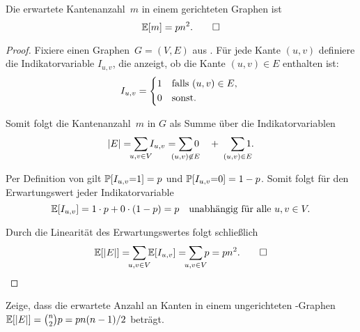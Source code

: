 \begin{lemma}\label{lemma:erwartete_kanten_in_gnp}
    Die  erwartete Kantenanzahl~$m$ in einem gerichteten \Gnp Graphen ist \begin{equation*} \mathbb{E}\!\left[m\right] = p n^2. \qedhere \end{equation*}
\end{lemma}

\begin{proof}
    Fixiere einen Graphen~$G=(V,E)$ aus \Gnp.
    Für jede Kante $(u,v)$ definiere die Indikatorvariable $I_{u,v}$, die anzeigt, ob die Kante $(u,v) \in E$ enthalten ist:
    \begin{equation}
        I_{u,v} = \begin{cases*}
            1 & falls $(u,v) \in E$, \\
            0 & sonst.
        \end{cases*}
    \end{equation}

    \noindent Somit folgt die Kantenanzahl~$m$ in $G$ als Summe über die Indikatorvariablen
    \begin{equation}
        |E| = \smashoperator{\sum_{u,v \in V}} I_{u,v} = \smashoperator{\sum_{(u,v) \not\in E}} 0 \quad + \quad \smashoperator{\sum_{(u,v) \in E}} 1.
    \end{equation}

    \noindent Per Definition von \Gnp gilt $\mathbb{P}\!\left[I_{u,v} {=} 1\right] = p$ und $\mathbb{P}\!\left[I_{u,v} {=} 0\right] = 1-p$.
    Somit folgt für den Erwartungswert jeder Indikatorvariable
    \begin{equation}
        \mathbb{E}\!\left[I_{u,v}\right] = 1 \cdot p + 0 \cdot (1-p) = p \quad \text{unabhängig für alle } u, v \in V.
    \end{equation}

    \noindent Durch die Linearität des Erwartungswertes folgt schließlich
    \begin{equation}
        \expv{|E|} = \smashoperator{\sum_{u,v \in V}} \expv{I_{u,v}} = \smashoperator{\sum_{u,v \in V}} p = p n^2. \qedhere
    \end{equation}
\end{proof}

\begin{exercise}
    Zeige, dass die erwartete Anzahl an Kanten in einem ungerichteten \Gnp-Graphen $\mathbb{E}\!\left[|E|\right] = \binom{n}{2} p = p n(n-1)/2$ beträgt.
\end{exercise}

